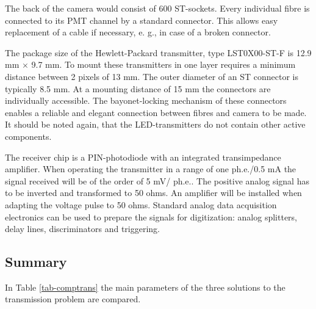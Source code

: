 The back of the camera would consist of 600 ST-sockets. Every individual
fibre is connected to its PMT channel by a standard connector. This allows
easy replacement of a cable if necessary, e. g., in case of a broken
connector.

The package size of the Hewlett-Packard transmitter, type LST0X00-ST-F is
12.9 mm $\times$ 9.7 mm. To mount these transmitters in one layer requires a
minimum distance between 2 pixels of 13 mm. The outer diameter of an ST
connector is typically 8.5 mm. At a mounting distance of 15 mm the
connectors are individually accessible. The bayonet-locking mechanism of
these connectors enables a reliable and elegant connection between fibres
and camera to be made. It should be noted again, that the LED-transmitters
do not contain other active components.

The receiver chip is a PIN-photodiode with an integrated transimpedance
amplifier. When operating the transmitter in a range of one  ph.e./0.5 mA
the signal received will be of the order of 5 mV/ ph.e.. The positive analog
signal has to be inverted and transformed to 50 ohms. An amplifier will be
installed when adapting the voltage pulse to 50 ohms. Standard analog data
acquisition electronics can be used to prepare the signals for digitization:
analog splitters, delay lines, discriminators and triggering.

\subsection{Summary}

In Table \ref{tab-comptrans} the main parameters of the three solutions
to the transmission problem are compared.

